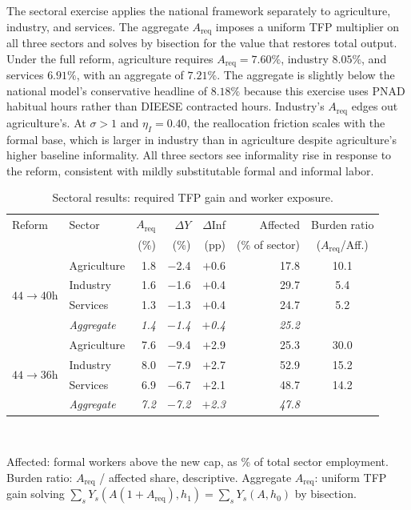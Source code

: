 The sectoral exercise applies the national framework separately to agriculture, industry, and services. The aggregate $A_{\text{req}}$ imposes a uniform TFP multiplier on all three sectors and solves by bisection for the value that restores total output. Under the full reform, agriculture requires $A_{\text{req}}=7.60\%$, industry $8.05\%$, and services $6.91\%$, with an aggregate of $7.21\%$. The aggregate is slightly below the national model's conservative headline of $8.18\%$ because this exercise uses PNAD habitual hours rather than DIEESE contracted hours. Industry's $A_{\text{req}}$ edges out agriculture's. At $\sigma>1$ and $\eta_I=0.40$, the reallocation friction scales with the formal base, which is larger in industry than in agriculture despite agriculture's higher baseline informality. All three sectors see informality rise in response to the reform, consistent with mildly substitutable formal and informal labor.

\begin{table}[htbp]
\centering
\caption{Sectoral results: required TFP gain and worker exposure.}\label{tab:sectoral_results}
\small
\begin{tabular}{llrrrrc}
\hline\hline
Reform & Sector & $A_{\text{req}}$ & $\Delta Y$ & $\Delta$Inf & Affected & Burden ratio \\
 & & (\%) & (\%) & (pp) & (\% of sector) & ($A_{\text{req}}$/Aff.) \\
\hline
\multirow{4}{*}{$44\to 40$h}
& Agriculture & 1.8 & $-$2.4 & $+$0.6 & 17.8 & 10.1 \\
& Industry    & 1.6 & $-$1.6 & $+$0.4 & 29.7 & 5.4 \\
& Services    & 1.3 & $-$1.3 & $+$0.4 & 24.7 & 5.2 \\
& \textit{Aggregate} & \textit{1.4} & \textit{$-$1.4} & \textit{$+$0.4} & \textit{25.2} & \\
\hline
\multirow{4}{*}{$44\to 36$h}
& Agriculture & 7.6 & $-$9.4 & $+$2.9 & 25.3 & 30.0 \\
& Industry    & 8.0 & $-$7.9 & $+$2.7 & 52.9 & 15.2 \\
& Services    & 6.9 & $-$6.7 & $+$2.1 & 48.7 & 14.2 \\
& \textit{Aggregate} & \textit{7.2} & \textit{$-$7.2} & \textit{$+$2.3} & \textit{47.8} & \\
\hline\hline
\end{tabular}
\\[2pt]
\begin{minipage}{0.95\textwidth}
\justifying
{\footnotesize Affected: formal workers above the new cap, as \% of total sector employment. Burden ratio: $A_{\text{req}}$ / affected share, descriptive. Aggregate $A_{\text{req}}$: uniform TFP gain solving $\sum_s Y_s(A(1+A_{\text{req}}),h_1)=\sum_s Y_s(A,h_0)$ by bisection.}
\end{minipage}
\end{table}

